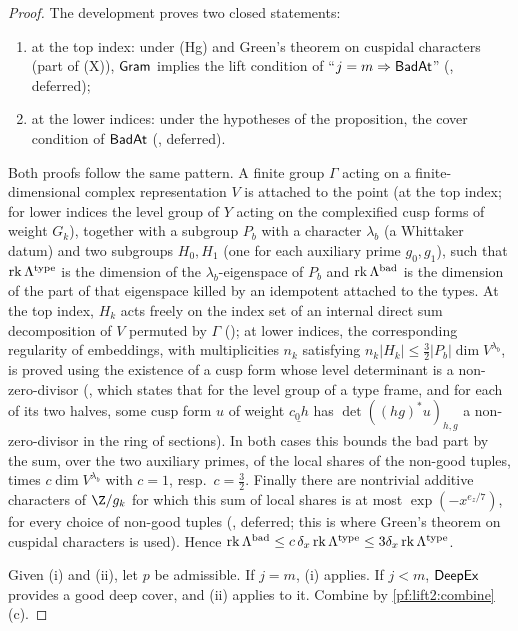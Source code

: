 \begin{proof}
The development proves two closed statements:
\begin{enumerate}[label=(\roman*)]
\item at the top index: under \textup{(Hg)} and Green's theorem on cuspidal characters (part of \textup{(X)}), $\mathsf{Gram}$
implies the lift condition of ``$j=m\Rightarrow\mathsf{BadAt}$''
(, deferred);
\item at the lower indices: under the hypotheses of the proposition, the cover condition of $\mathsf{BadAt}$
(, deferred).
\end{enumerate}
Both proofs follow the same pattern. A finite group $\Gamma$ acting on a finite-dimensional complex representation
$V$ is attached to the point (at the top index; for lower indices the level group of $Y$ acting on the complexified
cusp forms of weight $G_k$), together with a subgroup $P_b$ with a character $\lambda_b$ (a Whittaker datum) and two
subgroups $H_0,H_1$ (one for each auxiliary prime $g_0,g_1$), such that $\operatorname{rk}\Lambda^{\mathrm{type}}$ is the dimension
of the $\lambda_b$-eigenspace of $P_b$ and $\operatorname{rk}\Lambda^{\mathrm{bad}}$ is the dimension of the part of that eigenspace
killed by an idempotent attached to the types. At the top index, $H_k$ acts freely on the index set of an internal direct
sum decomposition of $V$ permuted by $\Gamma$ (); at
lower indices, the corresponding regularity of embeddings, with multiplicities $n_k$ satisfying
$n_k|H_k|\le\frac32|P_b|\dim V^{\lambda_b}$, is proved using the existence of a cusp form whose level determinant is a
non-zero-divisor (, which states that for the level group of
a type frame, and for each of its two halves, some cusp form $u$ of weight $\underline{c_0h}$ has
$\det((hg)^*u)_{h,g}$ a non-zero-divisor in the ring of sections). In both cases this bounds the bad part by the sum,
over the two auxiliary primes, of the local shares of the non-good tuples, times $c\dim V^{\lambda_b}$ with $c=1$,
resp.\ $c=\frac32$. Finally there are nontrivial additive characters of $\Z/g_k$ for which this sum of local shares is at
most $\exp(-x^{e_z/7})$, for every choice of non-good tuples
(, deferred; this is where Green's theorem on
cuspidal characters is used). Hence $\operatorname{rk}\Lambda^{\mathrm{bad}}\le c\,\delta_x\operatorname{rk}\Lambda^{\mathrm{type}}\le3\delta_x
\operatorname{rk}\Lambda^{\mathrm{type}}$.

Given (i) and (ii), let $p$ be admissible. If $j=m$, (i) applies. If $j<m$, $\mathsf{DeepEx}$ provides a good deep
cover, and (ii) applies to it. Combine by \cref{pf:lift2:combine}(c).
\end{proof}

